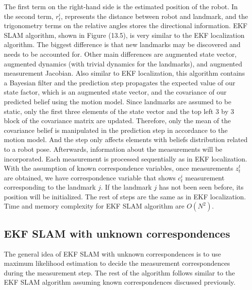 The first term on the right-hand side is the estimated position of the robot. In the second term, $r^{i}_{t}$, represents the distance between robot and landmark, and the trigonometry terms on the relative angles stores the directional information. EKF SLAM algorithm, shown in Figure (13.5), is very similar to the EKF localization algorithm. The biggest difference is that new landmarks may be discovered and needs to be accounted for. Other main differences are augmented state vector, augmented dynamics (with trivial dynamics for the landmarks), and augmented measurement Jacobian. Also similar to EKF localization, this algorithm contains a Bayesian filter and the prediction step propagates the expected value of our state factor, which is an augmented state vector, and the covariance of our predicted belief using the motion model. Since landmarks are assumed to be static, only the first three elements of the state vector and the top left 3 by 3 block of the covariance matrix are updated. Therefore, only the mean of the covariance belief is manipulated in the prediction step in accordance to the motion model. And the step only affects elements with beliefs
distribution related to a robot pose. Afterwards, information about the measurements will be incorporated. Each measurement is processed
sequentially as in EKF localization. With the assumption of known correspondence variables, once measurements $z^{t}_{t}$ are obtained, we have correspondence variable that shows $c^{i}_{t}$ measurement corresponding to the landmark $j$. If the landmark $j$ has not been seen before, its position will be initialized. The rest of steps
are the same as in EKF localization. Time and memory complexity for EKF SLAM algorithm are $O(N^{2})$.

\subsection{EKF SLAM with unknown correspondences}
The general idea of EKF SLAM with unknown correspondences is to use maximum likelihood estimation to decide the measurement correspondences during the measurement step. The rest of the algorithm follows similar to the EKF SLAM algorithm assuming known correspondences discussed previously.

